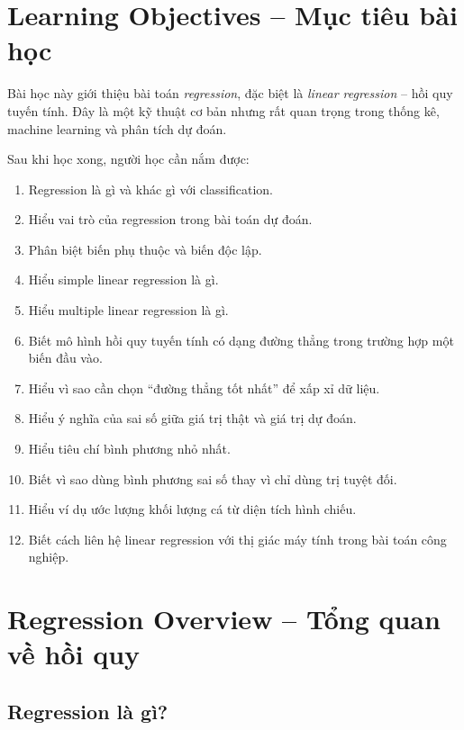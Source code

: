 \section*{Learning Objectives -- Mục tiêu bài học}

Bài học này giới thiệu bài toán \textit{regression}, đặc biệt là \textit{linear regression} -- hồi quy tuyến tính. Đây là một kỹ thuật cơ bản nhưng rất quan trọng trong thống kê, machine learning và phân tích dự đoán.

Sau khi học xong, người học cần nắm được:

\begin{enumerate}[label=\arabic*.]
    \item Regression là gì và khác gì với classification.
    \item Hiểu vai trò của regression trong bài toán dự đoán.
    \item Phân biệt biến phụ thuộc và biến độc lập.
    \item Hiểu simple linear regression là gì.
    \item Hiểu multiple linear regression là gì.
    \item Biết mô hình hồi quy tuyến tính có dạng đường thẳng trong trường hợp một biến đầu vào.
    \item Hiểu vì sao cần chọn ``đường thẳng tốt nhất'' để xấp xỉ dữ liệu.
    \item Hiểu ý nghĩa của sai số giữa giá trị thật và giá trị dự đoán.
    \item Hiểu tiêu chí bình phương nhỏ nhất.
    \item Biết vì sao dùng bình phương sai số thay vì chỉ dùng trị tuyệt đối.
    \item Hiểu ví dụ ước lượng khối lượng cá từ diện tích hình chiếu.
    \item Biết cách liên hệ linear regression với thị giác máy tính trong bài toán công nghiệp.
\end{enumerate}

\section{Regression Overview -- Tổng quan về hồi quy}

\subsection{Regression là gì?}

